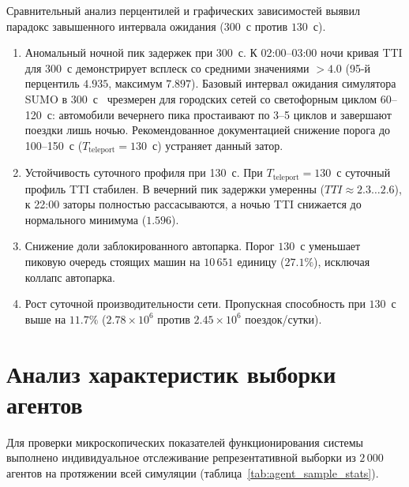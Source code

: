 Сравнительный анализ перцентилей и графических зависимостей выявил парадокс завышенного интервала ожидания ($300$~с против $130$~с).
\begin{enumerate}
    \item Аномальный ночной пик задержек при 300~с. К 02:00--03:00 ночи кривая TTI для 300~с демонстрирует всплеск со средними значениями $>4.0$ (95-й перцентиль $4.935$, максимум $7.897$). Базовый интервал ожидания симулятора SUMO в 300~с~\cite{sumo_teleport} чрезмерен для городских сетей со светофорным циклом 60--120~с: автомобили вечернего пика простаивают по 3--5 циклов и завершают поездки лишь ночью. Рекомендованное документацией снижение порога до 100--150~с ($T_{\text{teleport}} = 130$~с) устраняет данный затор.
    \item Устойчивость суточного профиля при 130~с. При $T_{\text{teleport}} = 130$~с суточный профиль TTI стабилен. В вечерний пик задержки умеренны ($TTI \approx 2.3\dots 2.6$), к 22:00 заторы полностью рассасываются, а ночью TTI снижается до нормального минимума ($1.596$).
    \item Снижение доли заблокированного автопарка. Порог $130$~с уменьшает пиковую очередь стоящих машин на $10\,651$ единицу ($27.1\%$), исключая коллапс автопарка.
    \item Рост суточной производительности сети. Пропускная способность при $130$~с выше на $11.7\%$ ($2.78 \times 10^6$ против $2.45 \times 10^6$ поездок/сутки).
\end{enumerate}

\section{Анализ характеристик выборки агентов}
\label{sec:sample_metrics}

Для проверки микроскопических показателей функционирования системы выполнено индивидуальное отслеживание репрезентативной выборки из $2\,000$ агентов на протяжении всей симуляции (таблица~\ref{tab:agent_sample_stats}).

